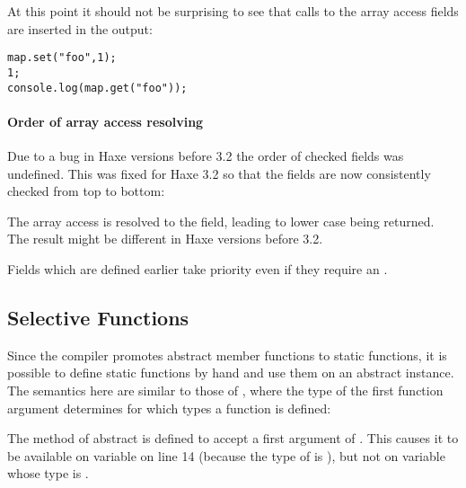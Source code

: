 
At this point it should not be surprising to see that calls to the array access fields are inserted in the output:

\begin{lstlisting}
map.set("foo",1);
1;
console.log(map.get("foo"));
\end{lstlisting}

\paragraph{Order of array access resolving}
\label{types-abstract-array-access-order}

Due to a bug in Haxe versions before 3.2 the order of checked  fields was undefined. This was fixed for Haxe 3.2 so that the fields are now consistently checked from top to bottom:


The array access  is resolved to the  field, leading to lower case  being returned. The result might be different in Haxe versions before 3.2.

Fields which are defined earlier take priority even if they require an .


\subsection{Selective Functions}
\label{types-abstract-selective-functions}

Since the compiler promotes abstract member functions to static functions, it is possible to define static functions by hand and use them on an abstract instance. The semantics here are similar to those of , where the type of the first function argument determines for which types a function is defined:

The method  of abstract  is defined to accept a first argument of . This causes it to be available on variable  on line 14 (because the type of  is ), but not on variable  whose type is .



